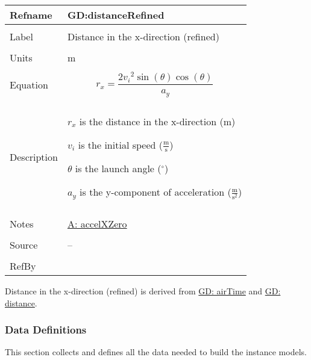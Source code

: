 \documentclass[12pt]{article}
\begin{document}
\noindent \begin{minipage}{\textwidth}
\begin{tabular}{p{} p{}}
\toprule \textbf{Refname} & \textbf{GD:distanceRefined}
\label{GD:distanceRefined}
\\ \midrule \\
Label & Distance in the x-direction (refined)
\\ \midrule \\
Units & m
\\ \midrule \\
Equation & \begin{displaymath}
           {r_{x}}=\frac{2 {v_{i}}^{2} \sin\left(θ\right) \cos\left(θ\right)}{{a_{y}}}
           \end{displaymath}
\\ \midrule \\
Description & \begin{symbDescription}
              \item{${r_{x}}$ is the distance in the x-direction (m)}
              \item{${v_{i}}$ is the initial speed ($\frac{\text{m}}{\text{s}}$)}
              \item{$θ$ is the launch angle (${}^{\circ}$)}
              \item{${a_{y}}$ is the y-component of acceleration ($\frac{\text{m}}{\text{s}^{2}}$)}
              \end{symbDescription}
\\ \midrule \\
Notes & \hyperref[accelXZero]{A: accelXZero}
\\ \midrule \\
Source & --
\\ \midrule \\
RefBy & 
\\ \bottomrule \end{tabular}
\end{minipage}
Distance in the x-direction (refined) is derived from \hyperref[GD:airTime]{GD: airTime} and \hyperref[GD:distance]{GD: distance}.
\subsubsection{Data Definitions}
\label{Sec:DDs}
This section collects and defines all the data needed to build the instance models.
\par~
\end{document}
